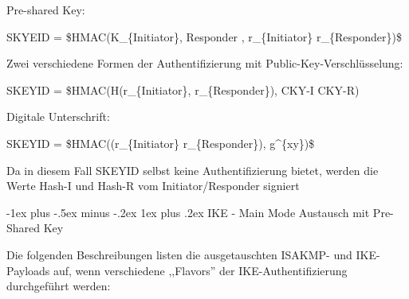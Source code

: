 \documentclass[a4paper]{article}
\makeatletter
\renewcommand{\subsubsection}{\@startsection{subsubsection}{3}{0mm}%
 {-1ex plus -.5ex minus -.2ex}%
 {1ex plus .2ex}%
 {\normalfont\small\bfseries}}
\makeatother
\begin{document}
\begin{multicols}{3}
\begin{itemize*}
\begin{itemize*}
                  \begin{itemize*}
                        \item Pre-shared Key:
                        \begin{itemize*} \item SKYEID = \$HMAC(K\_\{Initiator\}, Responder , r\_\{Initiator\} \textbar{} r\_\{Responder\})\$ \end{itemize*}
                        \item Zwei verschiedene Formen der Authentifizierung mit Public-Key-Verschlüsselung:
                        \begin{itemize*} \item SKEYID = \$HMAC(H(r\_\{Initiator\}, r\_\{Responder\}), CKY-I \textbar{} CKY-R) \end{itemize*}
                        \item Digitale Unterschrift:
                        \begin{itemize*} \item SKEYID = \$HMAC((r\_\{Initiator\} \textbar{} r\_\{Responder\}), g\^{}\{xy\})\$ \item Da in diesem Fall SKEYID selbst keine Authentifizierung bietet, werden die Werte Hash-I und Hash-R vom Initiator/Responder signiert \end{itemize*}
                  \end{itemize*}
            \end{itemize*}


            \subsubsection{IKE - Main Mode Austausch mit Pre-Shared
                  Key}

            \begin{itemize*}
                  \item
                  Die folgenden Beschreibungen listen die ausgetauschten ISAKMP- und
                  IKE-Payloads auf, wenn verschiedene ,,Flavors'' der
                  IKE-Authentifizierung durchgeführt werden:


\end{itemize*}
\end{itemize*}
\end{multicols}
\end{document}
